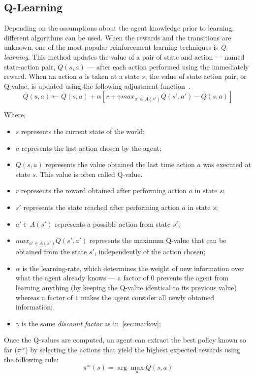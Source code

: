 \subsection{Q-Learning}
\label{subsec:ql}

Depending on the assumptions about the agent knowledge prior to learning, different algorithms can be used. 
When the rewards and the transitions are unknown, one of the most popular reinforcement learning techniques is \textit{Q-learning}. 
This method updates the value of a pair of state and action --- named state-action pair, $Q(s,a)$ ---
after each action performed using the immediately reward. 
When an action $a$ is taken at a state $s$, the value of state-action pair, or Q-value,
is updated using the following adjustment function~\cite{amato2010highlevel}.
% 
	$$Q(s,a) \leftarrow Q(s,a) + \alpha[r + \gamma max_{a' \in A(s')}Q(s',a') - Q(s,a)]$$
% 

Where, 
\begin{itemize}
\item $s$ represents the current state of the world;
\item $a$ represents the last action chosen by the agent;
\item $ Q(s,a) $ represents the value obtained the last time action $a$ was executed at state $s$.
This value is often called Q-value.
\item $r$ represents the reward obtained after performing action $a$ in state $s$;
\item $s'$ represents the state reached after performing action $a$ in state $s$;
\item $a' \in A(s')$ represents a possible action from state $s'$;
\item $max_{a' \in A(s')}Q(s',a')$ represents the maximum Q-value that can be obtained from the state $s'$, independently of the action chosen;
\item $\alpha$ is the learning-rate, which determines the weight of new information over what the agent already knows --- a factor of $0$ prevents the agent from learning anything (by keeping the Q-value identical to its previous value) whereas a factor of $1$ makes the agent consider all newly obtained information;
\item $\gamma$ is the same \textit{discount factor} as in~\ref{sec:markov};
\end{itemize}

Once the Q-values are computed, an agent can extract the best policy known so far ($\pi^{\approx}$) by selecting the actions that yield the highest expected rewards using the following rule:
$$\pi^{\approx}(s) = \arg\max_{a}Q(s,a) $$

